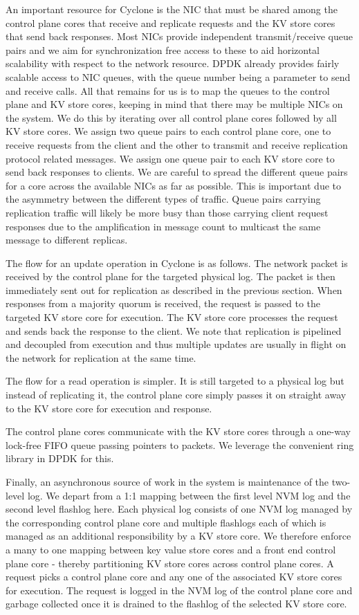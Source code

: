 \documentclass[10pt, preprint, nonatbib]{sigplanconf}
\begin{document}
An important resource for Cyclone is the NIC that must be shared among the
control plane cores that receive and replicate requests and the KV store cores
that send back responses. Most NICs provide independent transmit/receive queue
pairs and we aim for synchronization free access to these to aid horizontal
scalability with respect to the network resource. DPDK already provides fairly
scalable access to NIC queues, with the queue number being a parameter to send
and receive calls. All that remains for us is to map the queues to the control
plane and KV store cores, keeping in mind that there may be multiple NICs on the
system. We do this by iterating over all control plane cores followed by all KV
store cores. We assign two queue pairs to each control plane core, one to
receive requests from the client and the other to transmit and receive
replication protocol related messages. We assign one queue pair to each KV store
core to send back responses to clients. We are careful to spread the different
queue pairs for a core across the available NICs as far as possible. This is
important due to the asymmetry between the different types of traffic. Queue
pairs carrying replication traffic will likely be more busy than those carrying
client request responses due to the amplification in message count to multicast
the same message to different replicas.

The flow for an update operation in Cyclone is as follows. The network packet is
received by the control plane for the targeted physical log. The packet is then
immediately sent out for replication as described in the previous section. When
responses from a majority quorum is received, the request is passed to the
targeted KV store core for execution. The KV store core processes the request
and sends back the response to the client. We note that replication is pipelined
and decoupled from execution and thus multiple updates are usually in flight on
the network for replication at the same time.

The flow for a read operation is simpler. It is still targeted to a physical log
but instead of replicating it, the control plane core simply passes it on
straight away to the KV store core for execution and response.

The control plane cores communicate with the KV store cores through a one-way
lock-free FIFO queue passing pointers to packets. We leverage the convenient
ring library in DPDK for this.

Finally, an asynchronous source of work in the system is maintenance of the
two-level log. We depart from a 1:1 mapping between the first level NVM log and
the second level flashlog here. Each physical log consists of one NVM log
managed by the corresponding control plane core and multiple flashlogs each of
which is managed as an additional responsibility by a KV store core. We
therefore enforce a many to one mapping between key value store cores and a
front end control plane core - thereby partitioning KV store cores across
control plane cores. A request picks a control plane core and any one of the
associated KV store cores for execution. The request is logged in the NVM log of
the control plane core and garbage collected once it is drained to the flashlog
of the selected KV store core.
\end{document}
